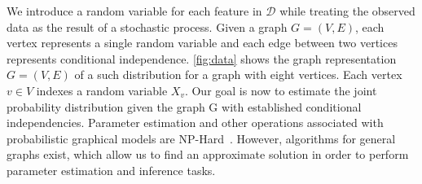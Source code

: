 


We introduce a random variable for each feature in $\mathcal{D}$ while treating the observed data as the result of a stochastic process.
Given a graph $G=(V,E)$, each vertex represents a single random variable and each edge between two vertices represents conditional independence. 
\fig \ref{fig:data} shows the graph representation $G=(V,E)$ of a such distribution for a graph with eight vertices. 
Each vertex $ v \in V$ indexes a random variable $X_v$.
Our goal is now to estimate the joint probability distribution given the graph G with established conditional independencies.
Parameter estimation and other operations associated with probabilistic graphical models are NP-Hard~\cite{cooper1990computational}.
However, algorithms for general graphs exist, which allow us to find an approximate solution in order to perform parameter estimation and inference tasks.

